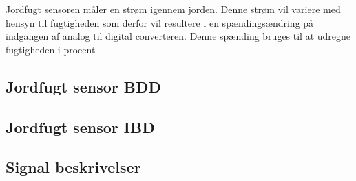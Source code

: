 
Jordfugt sensoren måler en strøm igennem jorden. Denne strøm vil variere med hensyn til fugtigheden som derfor vil resultere i en spændingsændring på indgangen af analog til digital converteren. Denne spænding bruges til at udregne fugtigheden i procent

\subsection{Jordfugt sensor BDD}

\subsection{Jordfugt sensor IBD}

\subsection{Signal beskrivelser}

